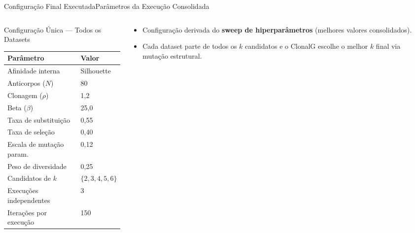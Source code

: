 \documentclass[aspectratio=169, 11pt]{beamer}
\begin{document}
\begin{frame}{Configuração Final Executada}{Parâmetros da Execução Consolidada}
  \begin{columns}[T]
    \begin{column}{0.5\textwidth}
      \begin{block}{Configuração Única --- Todos os Datasets}
        \centering
        \scriptsize
        \begin{tabular}{ll}
          \toprule
          \textbf{Parâmetro} & \textbf{Valor} \\
          \midrule
          Afinidade interna          & Silhouette \\
          Anticorpos ($N$)           & 80 \\
          Clonagem ($\rho$)          & 1,2 \\
          Beta ($\beta$)             & 25,0 \\
          Taxa de substituição       & 0,55 \\
          Taxa de seleção            & 0,40 \\
          Escala de mutação param.   & 0,12 \\
          Peso de diversidade        & 0,25 \\
          Candidatos de $k$          & $\{2,3,4,5,6\}$ \\
          Execuções independentes    & 3 \\
          Iterações por execução     & 150 \\
          \bottomrule
        \end{tabular}
      \end{block}
    \end{column}
    
    \begin{column}{0.48\textwidth}
      \vspace{0.4cm}
      \begin{itemize}
        \item Configuração derivada do \textbf{sweep de hiperparâmetros} (melhores valores consolidados).
        \item Cada dataset parte de todos os $k$ candidatos e o ClonalG escolhe o melhor $k$ final via mutação estrutural.
      \end{itemize}
    \end{column}
  \end{columns}
\end{frame}
\end{document}
